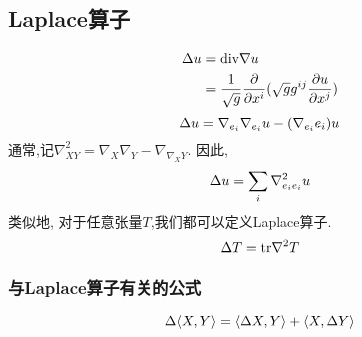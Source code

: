 \subsection{Laplace算子}
\begin{equation}
    \begin{split}
        {\Delta} u &={\text{div}} \nabla u \\
        &={{\frac{1}{\sqrt{g}}}}\frac{{\partial}}{{\partial} x^i}(\sqrt{g}g^{ij}\frac{{\partial} u}{{\partial} x^j}) 
    \end{split}
\end{equation}
\begin{equation}
    {\Delta} u=\nabla_{e_i}\nabla_{e_i}u-(\nabla_{e_i}e_i)u
\end{equation}
通常,记$\nabla^2_{XY}=\nabla_X\nabla_Y-\nabla_{\nabla_XY}$. 因此,
\begin{equation}
    {\Delta} u=\sum_i\nabla^2_{e_ie_i}u
\end{equation}
类似地, 对于任意张量$T$,我们都可以定义Laplace算子.
\begin{equation}
    {\Delta} T={\text{tr}} \nabla^2 T
\end{equation}
\subsubsection{与Laplace算子有关的公式}
\begin{equation}
    {\Delta}{\left < X, Y \right >}={\left < {\Delta} X, Y \right >}+{\left < X, {\Delta} Y \right >}
\end{equation}